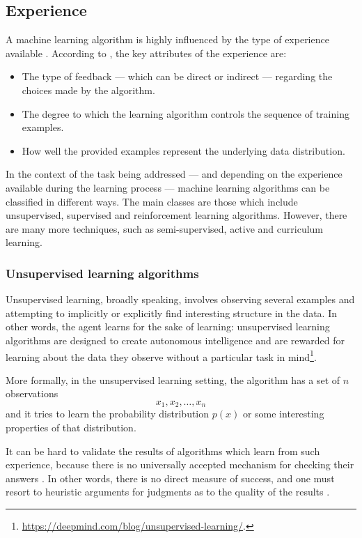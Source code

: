         \subsection{Experience}
            A machine learning algorithm is highly influenced by the type of experience available \cite[5]{Mitchell}. According to \citeauthor{Mitchell}, the key attributes of the experience are:
            \begin{itemize}
                \item The type of feedback --- which can be direct or indirect --- regarding the choices made by the algorithm.
                \item The degree to which the learning algorithm controls the sequence of training examples.
                \item How well the provided examples represent the underlying data distribution.
            \end{itemize}
            In the context of the task being addressed --- and depending on the experience available during the learning process --- machine learning algorithms can be classified in different ways. The main classes are those which include unsupervised, supervised and reinforcement learning algorithms. However, there are many more techniques, such as semi-supervised, active and curriculum learning.
            \subsubsection{Unsupervised learning algorithms}
                Unsupervised learning, broadly speaking, involves observing several examples and attempting to implicitly or explicitly find interesting structure in the data. In other words, the agent learns for the sake of learning: unsupervised learning algorithms are designed to create autonomous intelligence and are rewarded for learning about the data they observe without a particular task in mind\footnote{\url{https://deepmind.com/blog/unsupervised-learning/}.}.
                
                More formally, in the unsupervised learning setting, the algorithm has a set of \(n\) observations
                \[x_{1}, x_{2}, \dots, x_{n}\]
                and it tries to learn the probability distribution \(p\left(x\right)\) or some interesting properties of that distribution. 
                
                It can be hard to validate the results of algorithms which learn from such experience, because there is no universally accepted mechanism for checking their answers \cite[374]{James}. In other words, there is no direct measure of success, and one must resort to heuristic arguments for judgments as to the quality of the results \cite[487]{Hastie}.
